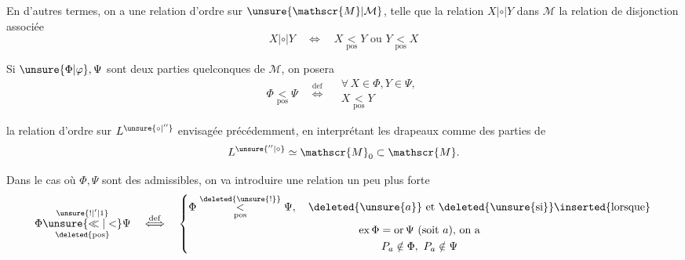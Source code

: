 
En d'autres termes, on a  une relation d'ordre sur $\unsure{\mathscr{M}|\mathcal{M}}$, telle que la relation $X\mathrel{|\circ|}Y$ dans $\mathscr{M}$  la relation de disjonction  associée
\[
X\mathrel{|\circ|}Y\quad\Longleftrightarrow\quad X\underset{\mathrm{pos}}{<}Y\text{ ou }Y\underset{\mathrm{pos}}{<}X
\]

Si $\unsure{\Phi|\varphi},\Psi$ sont deux parties quelconques de $\mathscr{M}$, on posera
\[
\Phi\underset{\mathrm{pos}}{<}\Psi\quad\overset{\mathrm{def}}{\Longleftrightarrow}\quad
\begin{gathered}
\forall\,X\in\Phi,Y\in\Psi,\\
X\underset{\mathrm{pos}}{<}Y
\end{gathered}
\]

 la relation d'ordre sur $L^{\unsure{\circ|''}}$ envisagée précédemment, en interprétant les drapeaux comme des parties de
\[
L^{\unsure{''|\circ}}\simeq\mathscr{M}_0\subset\mathscr{M}.
\]


Dans le cas où $\Phi,\Psi$ sont des  admissibles, on va introduire une relation un peu plus forte
\[
\Phi\overset{\unsure{!|'|1}}{\underset{\deleted{\mathrm{pos}}}{\unsure{\ll|<}}}\Psi
\quad\overset{\mathrm{def}}{\Longleftrightarrow}\quad
\left\{
\begin{gathered}
\Phi\overset{\deleted{\unsure{!}}}{\underset{\mathrm{pos}}{<}}\Psi,\quad\deleted{\unsure{a}}\text{ et \deleted{\unsure{si}}\inserted{lorsque}}\\
\operatorname{ex}\Phi=\operatorname{or}\Psi\text{ (soit }a\text{), on a}\\
P_a\notin\Phi,\ P_a\notin\Psi
\end{gathered}\right.
\]

